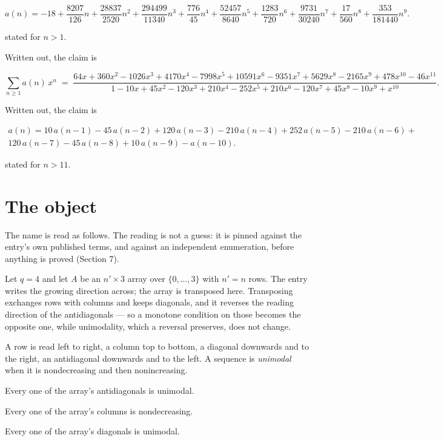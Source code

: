 \documentclass[11pt]{article}
\theoremstyle{definition}
\begin{document}
\[a(n) = -18 + \frac{8207}{126}n + \frac{28837}{2520}n^{2} + \frac{294499}{11340}n^{3} + \frac{776}{45}n^{4} + \frac{52457}{8640}n^{5} + \frac{1283}{720}n^{6} + \frac{9731}{30240}n^{7} + \frac{17}{560}n^{8} + \frac{353}{181440}n^{9}.\]

stated for $n > 1$.

Written out, the claim is

\[\sum_{n \ge 1} a(n)\,x^n \;=\; \frac{64x + 360x^{2} - 1026x^{3} + 4170x^{4} - 7998x^{5} + 10591x^{6} - 9351x^{7} + 5629x^{8} - 2165x^{9} + 478x^{10} - 46x^{11}}{1 - 10x + 45x^{2} - 120x^{3} + 210x^{4} - 252x^{5} + 210x^{6} - 120x^{7} + 45x^{8} - 10x^{9} + x^{10}}.\]

Written out, the claim is

\begin{multline*} a(n) = 10\,a(n-1) - 45\,a(n-2) + 120\,a(n-3) - 210\,a(n-4) + 252\,a(n-5) - 210\,a(n-6) + \\ 120\,a(n-7) - 45\,a(n-8) + 10\,a(n-9) - a(n-10). \end{multline*}

stated for $n > 11$.

\section{The object}

The name is read as follows. The reading is not a guess: it is pinned against the entry's own published terms, and against an independent enumeration, before anything is proved (Section 7).

Let $q = 4$ and let $A$ be an $n' \times 3$ array over $\{0,\dots,3\}$ with $n' = n$ rows. The entry writes the growing direction across; the array is transposed here. Transposing exchanges rows with columns and keeps diagonals, and it reverses the reading direction of the antidiagonals --- so a monotone condition on those becomes the opposite one, while unimodality, which a reversal preserves, does not change.

A row is read left to right, a column top to bottom, a diagonal downwards and to the right, an antidiagonal downwards and to the left. A sequence is {\itshape unimodal} when it is nondecreasing and then nonincreasing.

Every one of the array's antidiagonals is unimodal.

Every one of the array's columns is nondecreasing.

Every one of the array's diagonals is unimodal.
\end{document}
